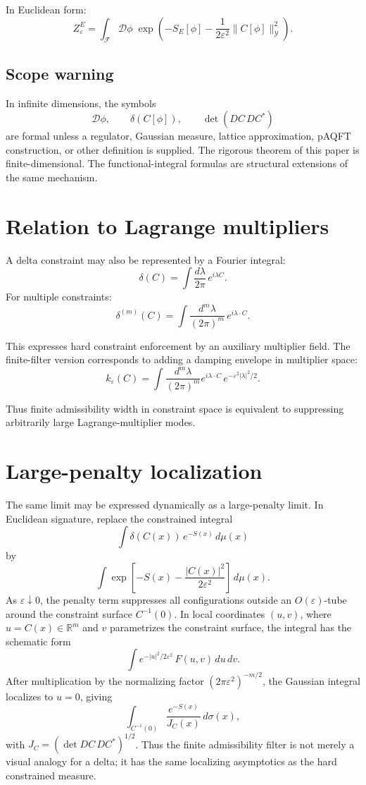 \documentclass[11pt]{article}
\begin{document}
In Euclidean form:
\[
Z_\varepsilon^E
=
\int_{\mathcal F}\mathcal D\phi\;
\exp\!\left(
-S_E[\phi]
-\frac{1}{2\varepsilon^2}\|C[\phi]\|_{\mathcal Y}^{2}
\right).
\]

\subsection{Scope warning}

In infinite dimensions, the symbols
\[
\mathcal D\phi,\qquad \delta(C[\phi]),\qquad \det(DC\,DC^\ast)
\]
are formal unless a regulator, Gaussian measure, lattice approximation, pAQFT construction,
or other definition is supplied.  The rigorous theorem of this paper is finite-dimensional.
The functional-integral formulas are structural extensions of the same mechanism.

\section{Relation to Lagrange multipliers}

A delta constraint may also be represented by a Fourier integral:
\[
\delta(C)=\int \frac{d\lambda}{2\pi}\,e^{i\lambda C}.
\]
For multiple constraints:
\[
\delta^{(m)}(C)=\int \frac{d^m\lambda}{(2\pi)^m}\,e^{i\lambda\cdot C}.
\]

This expresses hard constraint enforcement by an auxiliary multiplier field.  The finite-filter
version corresponds to adding a damping envelope in multiplier space:
\[
k_\varepsilon(C)
=
\int \frac{d^m\lambda}{(2\pi)^m}
e^{i\lambda\cdot C}\,
e^{-\varepsilon^2|\lambda|^2/2}.
\]

Thus finite admissibility width in constraint space is equivalent to suppressing arbitrarily
large Lagrange-multiplier modes.


\section{Large-penalty localization}

The same limit may be expressed dynamically as a large-penalty limit.  In Euclidean
signature, replace the constrained integral
\[
\int \delta(C(x))\,e^{-S(x)}\,d\mu(x)
\]
by
\[
\int
\exp\!\left[-S(x)-\frac{|C(x)|^2}{2\varepsilon^2}\right]\,d\mu(x).
\]
As \(\varepsilon\downarrow0\), the penalty term suppresses all configurations outside an
\(O(\varepsilon)\)-tube around the constraint surface \(C^{-1}(0)\).  In local coordinates
\((u,v)\), where \(u=C(x)\in\mathbb R^m\) and \(v\) parametrizes the constraint surface,
the integral has the schematic form
\[
\int e^{-|u|^2/2\varepsilon^2}\,F(u,v)\,du\,dv .
\]
After multiplication by the normalizing factor \((2\pi\varepsilon^2)^{-m/2}\), the Gaussian
integral localizes to \(u=0\), giving
\[
\int_{C^{-1}(0)}
\frac{e^{-S(x)}}{J_C(x)}\,d\sigma(x),
\]
with \(J_C=(\det DC\,DC^\ast)^{1/2}\).  Thus the finite admissibility filter is not merely
a visual analogy for a delta; it has the same localizing asymptotics as the hard constrained
measure.
\end{document}
